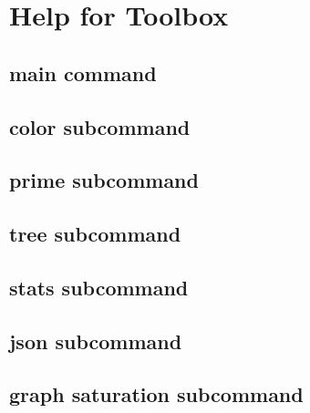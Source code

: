 \chapter{Help for Toolbox}

\section{main command\label{sec:main}}\nopagebreak[4] \vfill\pagebreak[1]

\section{color subcommand\label{sec:color}}\nopagebreak[4] 

\section{prime subcommand\label{sec:prime}}\nopagebreak[4]

\section{tree subcommand\label{sec:tree}}\nopagebreak[4]

\section{stats subcommand\label{sec:stats}}\nopagebreak[4]

\section{json subcommand\label{sec:json}}\nopagebreak[4]

\section{graph saturation subcommand\label{sec:graph}}\nopagebreak[4]
